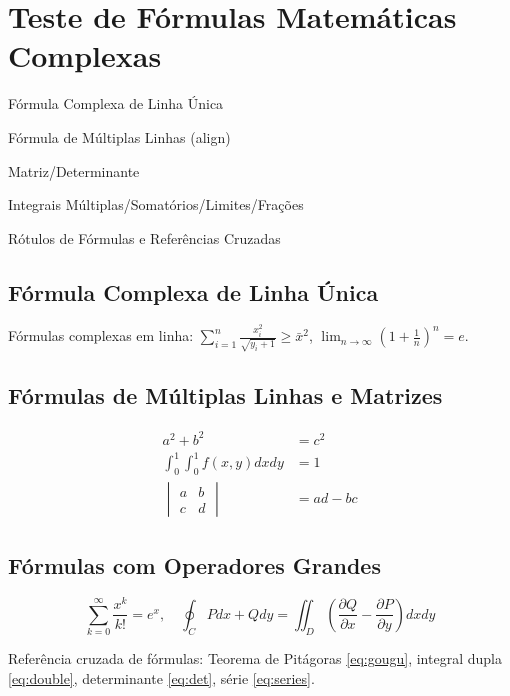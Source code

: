 \documentclass[pt]{../../elegantbook}
\begin{document}
\chapter{Teste de Fórmulas Matemáticas Complexas}
\begin{introduction}
\item Fórmula Complexa de Linha Única
\item Fórmula de Múltiplas Linhas (align)
\item Matriz/Determinante
\item Integrais Múltiplas/Somatórios/Limites/Frações
\item Rótulos de Fórmulas e Referências Cruzadas
\end{introduction}

\section{Fórmula Complexa de Linha Única}
Fórmulas complexas em linha: $\sum_{i=1}^n \frac{x_i^2}{\sqrt{y_i+1}} \geq \bar{x}^2$, $\lim_{n\to\infty} \left(1+\frac{1}{n}\right)^n = e$.

\section{Fórmulas de Múltiplas Linhas e Matrizes}
\begin{align}
a^2 + b^2 &= c^2 \label{eq:gougu} \\
\int_{0}^{1}\int_{0}^{1} f(x,y) dxdy &= 1 \label{eq:double} \\
\begin{vmatrix}
a & b \\
c & d
\end{vmatrix} &= ad-bc \label{eq:det}
\end{align}

\section{Fórmulas com Operadores Grandes}
\begin{equation}\label{eq:series}
\sum_{k=0}^{\infty} \frac{x^k}{k!} = e^x,\quad \oint_{C} Pdx+Qdy = \iint_{D}\left(\frac{\partial Q}{\partial x}-\frac{\partial P}{\partial y}\right)dxdy
\end{equation}

Referência cruzada de fórmulas: Teorema de Pitágoras \eqref{eq:gougu}, integral dupla \eqref{eq:double}, determinante \eqref{eq:det}, série \eqref{eq:series}.
\end{document}

